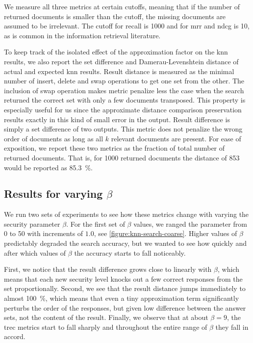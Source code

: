 				We measure all three metrics at certain cutoffs, meaning that if the number of returned documents is smaller than the cutoff, the missing documents are assumed to be irrelevant.
				The cutoff for recall is \num{1000} and for \acrshort{mrr} and \acrshort{ndcg} is 10, as is common in the information retrieval literature.

				To keep track of the isolated effect of the approximation factor on the \acrshort{knn} results, we also report the set difference and Damerau-Levenshtein distance \cite{levenshtein-distance,damerau-distance} of actual and expected \acrshort{knn} results.
				Result distance is measured as the minimal number of insert, delete and swap operations to get one set from the other.
				The inclusion of swap operation makes metric penalize less the case when the search returned the correct set with only a few documents transposed.
				This property is especially useful for us since the approximate distance comparison preservation results exactly in this kind of small error in the output.
				Result difference is simply a set difference of two outputs.
				This metric does not penalize the wrong order of documents as long as all $k$ relevant documents are present.
				For ease of exposition, we report these two metrics as the fraction of total number of returned documents.
				That is, for \num{1000} returned documents the distance of \num{853} would be reported as \SI{85.3}{\percent}.

			\subsection{Results for varying $\beta$}

				

				We run two sets of experiments to see how these metrics change with varying the security parameter $\beta$.
				For the first set of $\beta$ values, we ranged the parameter from 0 to 50 with increments of $1.0$, see \cref{figure:knn-search-coarse}.
				Higher values of $\beta$ predictably degraded the search accuracy, but we wanted to see how quickly and after which values of $\beta$ the accuracy starts to fall noticeably.

				First, we notice that the result difference grows close to linearly with $\beta$, which means that each new security level knocks out a few correct responses from the set proportionally.
				Second, we see that the result distance jumps immediately to almost \SI{100}{\percent}, which means that even a tiny approximation term significantly perturbs the order of the responses, but given low difference between the answer sets, not the content of the result.
				Finally, we observe that at about $\beta = 9$, the \acrshort{trec} metrics start to fall sharply and throughout the entire range of $\beta$ they fall in accord.

